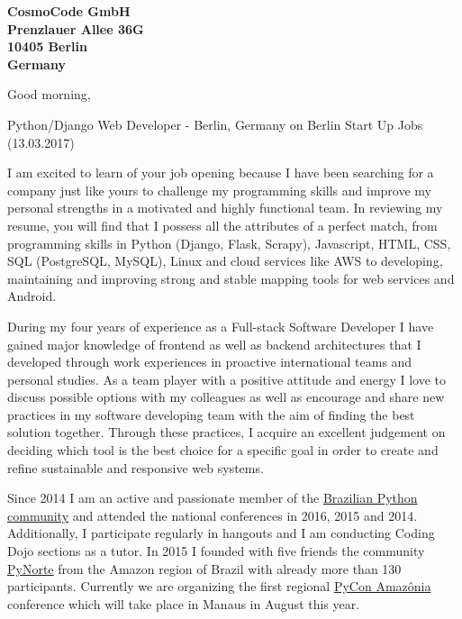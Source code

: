 \documentclass[a4paper]{joaosoares-letter}
\begin{document}
\longindentation=0pt


\begin{letter}{\bfseries CosmoCode GmbH\\Prenzlauer Allee 36G\\10405 Berlin\\Germany}


\date{Belém, \today}

\opening{Good morning,}{Python/Django Web Developer - Berlin, Germany on Berlin Start Up Jobs (13.03.2017)}

I am excited to learn of your job opening because I have been searching for a company just like yours to challenge my programming skills and improve my personal strengths in a motivated and highly functional team. In reviewing my resume, you will find that I possess all the attributes of a perfect match, from programming skills in Python (Django, Flask, Scrapy), Javascript, HTML, CSS, SQL (PostgreSQL, MySQL), Linux and cloud services like AWS to developing, maintaining and improving strong and stable mapping tools for web services and Android.

During my four years of experience as a Full-stack Software Developer I have gained major knowledge of frontend as well as backend architectures that I developed through work experiences in proactive international teams and personal studies. As a team player with a positive attitude and energy I love to discuss possible options with my colleagues as well as encourage and share new practices in my software developing team with the aim of finding the best solution together. Through these practices, I acquire an excellent judgement on deciding which tool is the best choice for a specific goal in order to create and refine sustainable and responsive web systems.

Since 2014 I am an active and passionate member of the \href{http://python.org.br}{Brazilian Python community} and attended the national conferences in 2016, 2015 and 2014. Additionally, I participate regularly in hangouts and I am conducting Coding Dojo sections as a tutor. In 2015 I founded with five friends the community \href{http://pynorte.python.org.br}{PyNorte} from the Amazon region of Brazil with already more than 130 participants. Currently we are organizing the first regional \href{http://amazonia.python.org.br/}{PyCon Amazônia} conference which will take place in Manaus in August this year.


\end{letter}
\end{document}
